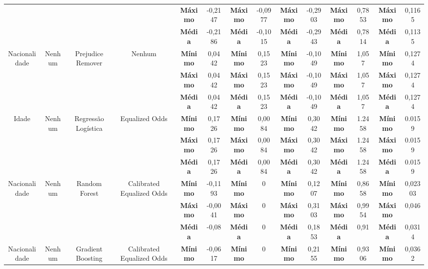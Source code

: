 \documentclass[Portugues,Final]{ic-tese-v3}
\begin{document}
\begin{table}[H]
\begin{center}
{\begin{tabular}{c|c|c|c|c|c|c|c|c|c|c|c|c|c}
             & & & & \textbf{Máximo} & -0,2147 & \textbf{Máximo} & -0,0977 & \textbf{Máximo} & -0,2903 & \textbf{Máximo} & 0,7853 & \textbf{Máximo} & 0,1165 \\
             & & & & \textbf{Média} & -0,2186 & \textbf{Média} & -0,1015 & \textbf{Média} & -0,2943 & \textbf{Média} & 0,7814 & \textbf{Média} & 0,1135 \\
            \hline
            \multirow{3}{*}{Nacionalidade} & \multirow{3}{*}{Nenhum} & \multirow{3}{*}{Prejudice Remover} & \multirow{3}{*}{Nenhum} & \textbf{Mínimo} & 0,0442 & \textbf{Mínimo} & 0,1523 & \textbf{Mínimo} & -0,1049 & \textbf{Mínimo} &  1,057 & \textbf{Mínimo} & 0,1274 \\
             & & & & \textbf{Máximo} & 0,0442 & \textbf{Máximo} & 0,1523 & \textbf{Máximo} & -0,1049 & \textbf{Máximo} & 1,057 & \textbf{Máximo} & 0,1274 \\
             & & & & \textbf{Média} & 0,0442 & \textbf{Média} & 0,1523 & \textbf{Média} & -0,1049 & \textbf{Média} & 1,057 & \textbf{Média} & 0,1274 \\
            \hline
            \multirow{3}{*}{Idade} & \multirow{3}{*}{Nenhum} & \multirow{3}{*}{Regressão Logística} & \multirow{3}{*}{Equalized Odds} & \textbf{Mínimo} & 0,1726 & \textbf{Mínimo} & 0,0084 & \textbf{Mínimo} & 0,3042 & \textbf{Mínimo} & 1.2458 & \textbf{Mínimo} & 0.0159 \\
             & & & & \textbf{Máximo} & 0,1726 & \textbf{Máximo} & 0,0084 & \textbf{Máximo} & 0,3042 & \textbf{Máximo} & 1.2458 & \textbf{Máximo} & 0.0159 \\
             & & & & \textbf{Média} & 0,1726 & \textbf{Média} & 0,0084 & \textbf{Média} & 0,3042 & \textbf{Média} & 1.2458 & \textbf{Média} & 0.0159 \\
            \hline
            \multirow{3}{*}{Nacionalidade} & \multirow{3}{*}{Nenhum} & \multirow{3}{*}{Random Forest} & \multirow{3}{*}{Calibrated Equalized Odds} & \textbf{Mínimo} & -0,1193 & \textbf{Mínimo} & 0 & \textbf{Mínimo} & 0,1207 & \textbf{Mínimo} & 0,8658 & \textbf{Mínimo} & 0,02303 \\
             & & & & \textbf{Máximo} & -0,0041 & \textbf{Máximo} & 0 & \textbf{Máximo} & 0,3103 & \textbf{Máximo} & 0,9954 & \textbf{Máximo} & 0,046 \\
             & & & & \textbf{Média} & -0,08 & \textbf{Média} & 0 & \textbf{Média} & 0,1853 & \textbf{Média} & 0,91 & \textbf{Média} & 0,0314 \\
            \hline
            \multirow{3}{*}{Nacionalidade} & \multirow{3}{*}{Nenhum} & \multirow{3}{*}{Gradient Boosting} & \multirow{3}{*}{Calibrated Equalized Odds} & \textbf{Mínimo} & -0,0617 & \textbf{Mínimo} & 0 & \textbf{Mínimo} & 0,2155 & \textbf{Mínimo} & 0,9306 & \textbf{Mínimo} & 0,0362 \\

\end{tabular}}
\end{center}
\end{table}
\end{document}
